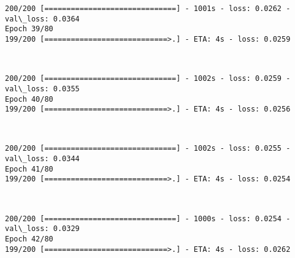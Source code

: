 \documentclass[11pt]{article}
\begin{document}
    \begin{Verbatim}[commandchars=\\\{\}]
200/200 [==============================] - 1001s - loss: 0.0262 - val\_loss: 0.0364
Epoch 39/80
199/200 [============================>.] - ETA: 4s - loss: 0.0259
    \end{Verbatim}

    \begin{center}
    \end{center}
    { \hspace*{\fill} \\}
    
    \begin{Verbatim}[commandchars=\\\{\}]
200/200 [==============================] - 1002s - loss: 0.0259 - val\_loss: 0.0355
Epoch 40/80
199/200 [============================>.] - ETA: 4s - loss: 0.0256
    \end{Verbatim}

    \begin{center}
    \end{center}
    { \hspace*{\fill} \\}
    
    \begin{Verbatim}[commandchars=\\\{\}]
200/200 [==============================] - 1002s - loss: 0.0255 - val\_loss: 0.0344
Epoch 41/80
199/200 [============================>.] - ETA: 4s - loss: 0.0254
    \end{Verbatim}

    \begin{center}
    \end{center}
    { \hspace*{\fill} \\}
    
    \begin{Verbatim}[commandchars=\\\{\}]
200/200 [==============================] - 1000s - loss: 0.0254 - val\_loss: 0.0329
Epoch 42/80
199/200 [============================>.] - ETA: 4s - loss: 0.0262
    \end{Verbatim}

    \begin{center}
    \end{center}
    { \hspace*{\fill} \\}
    
\end{document}
